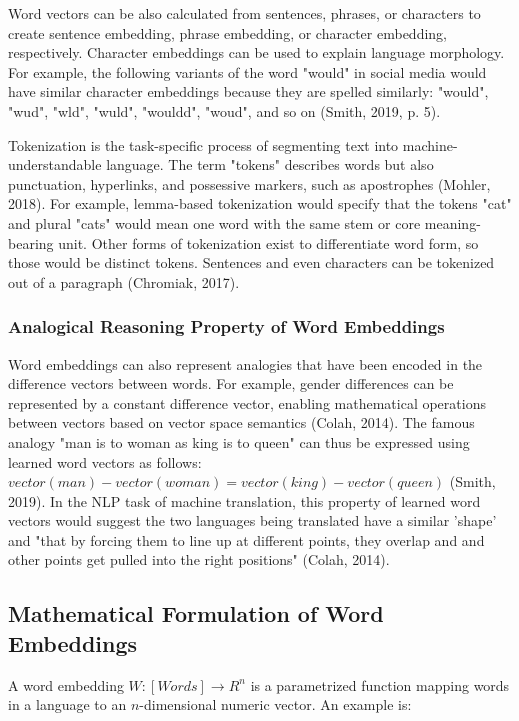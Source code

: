 Word vectors can be also calculated from sentences, phrases, or characters to create sentence embedding, phrase embedding, or character embedding, respectively. Character embeddings can be used to explain language morphology. For example, the following variants of the word "would" in social media would have similar character embeddings because they are spelled similarly: "would", "wud", "wld", "wuld", "wouldd", "woud", and so on (Smith, 2019, p. 5). 

Tokenization is the task-specific process of segmenting text into machine-understandable language. The term "tokens" describes words but also punctuation, hyperlinks, and possessive markers, such as apostrophes (Mohler, 2018). For example, lemma-based tokenization would specify that the tokens "cat" and plural "cats" would mean one word with the same stem or core meaning-bearing unit. Other forms of tokenization exist to differentiate word form, so those would be distinct tokens. Sentences and even characters can be tokenized out of a paragraph (Chromiak, 2017). 

\subsubsection{Analogical Reasoning Property of Word Embeddings}
Word embeddings can also represent analogies that have been encoded in the difference vectors between words. For example, gender differences can be represented by a constant difference vector, enabling mathematical operations between vectors based on vector space semantics (Colah, 2014). The famous analogy "man is to woman as king is to queen" can thus be expressed using learned word vectors as follows: $vector(man) - vector(woman) = vector(king) - vector(queen)$ (Smith, 2019). In the NLP task of machine translation, this property of learned word vectors would suggest the two languages being translated have a similar 'shape' and "that by forcing them to line up at different points, they overlap and and other points get pulled into the right positions" (Colah, 2014).

\subsection{Mathematical Formulation of Word Embeddings}
 
A word embedding $W: [Words] \rightarrow R^n$ is a parametrized function mapping words in a language to an $n$-dimensional numeric vector. An example is: 

